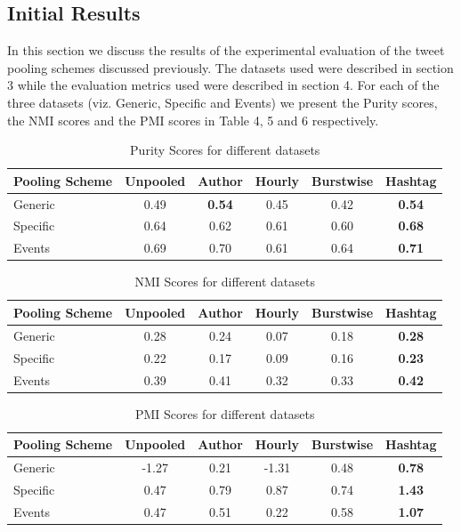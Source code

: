 \documentclass[10pt,a5paper,twoside]{article}
\begin{document}
\subsection{Initial Results}
In this section we discuss the results of the experimental evaluation of the tweet pooling schemes discussed previously. The datasets used were described in section 3 while the evaluation metrics used were described in section 4. For each of the three datasets (viz. Generic, Specific and Events) we present the Purity scores, the NMI scores and the PMI scores in Table 4, 5 and 6 respectively. 
\\
\begin{table}[!h]
\setcounter{table}{4}
\centering
	\begin{tabular}{|l|c|c|c|c|c|}
	\hline
	Pooling Scheme & Unpooled & Author & Hourly & Burstwise & Hashtag\\
	\hline
	Generic & 0.49 & \textbf{0.54} & 0.45 & 0.42 & \textbf{0.54}\\
	\hline
	Specific & 0.64 & 0.62 & 0.61 & 0.60 & \textbf{0.68}\\
	\hline
	Events & 0.69 & 0.70 & 0.61 & 0.64 & \textbf{0.71} \\
	\hline
	\end{tabular}
\caption{Purity Scores for different datasets}\label{Table}
\end{table}


\begin{table}[!h]
\setcounter{table}{5}
\centering
	\begin{tabular}{|l|c|c|c|c|c|}
	\hline
	Pooling Scheme & Unpooled & Author & Hourly & Burstwise & Hashtag\\
	\hline
	Generic & 0.28 & 0.24 & 0.07 & 0.18 & \textbf{0.28}\\
	\hline
	Specific & 0.22 & 0.17 & 0.09 & 0.16 & \textbf{0.23}\\
	\hline
	Events & 0.39 & 0.41 & 0.32 & 0.33 & \textbf{0.42}\\
	\hline
	\end{tabular}\caption{NMI Scores for different datasets}\label{Table}
\end{table}


\begin{table}[!h]
\setcounter{table}{6}
\centering
	\begin{tabular}{|l|c|c|c|c|c|}
	\hline
	Pooling Scheme & Unpooled & Author & Hourly & Burstwise & Hashtag\\
	\hline
	Generic & -1.27 & 0.21 & -1.31 & 0.48 & \textbf{0.78}\\
	\hline
	Specific & 0.47 & 0.79 & 0.87 & 0.74 & \textbf{1.43}\\
	\hline
	Events & 0.47 & 0.51 & 0.22 & 0.58 & \textbf{1.07}\\
	\hline
	\end{tabular}\caption{PMI Scores for different datasets}\label{Table}
\end{table}
\end{document}
